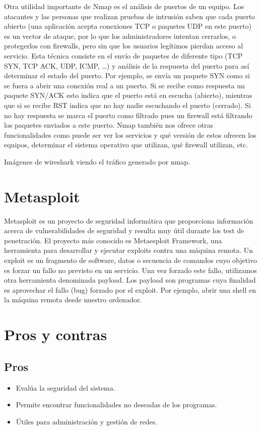 \documentclass[a4paper, 11pt]{article}
\theoremstyle{plain}
\begin{document}
Otra utilidad importante de Nmap es el análisis de puertos de un equipo. Los atacantes 
y las personas que realizan pruebas de intrusión saben que cada puerto abierto 
(una aplicación acepta conexiones TCP o paquetes UDP en este puerto) es 
un vector de ataque, por lo que los administradores intentan cerrarlos, o protegerlos
con firewalls, pero sin que los usuarios legítimos pierdan acceso al servicio.
Esta técnica consiste en el envío de paquetes de diferente tipo (TCP SYN, TCP ACK, UDP, ICMP, \dots)
y análisis de la respuesta del puerto para así determinar el estado del puerto.
Por ejemplo, se envía un paquete SYN como si se fuera a abrir una conexión real a un puerto.
Si se recibe como respuesta un paquete SYN/ACK esto indica que el puerto está en escucha (abierto),
mientras que si se recibe RST indica que no hay nadie escuchando el puerto (cerrado). Si 
no hay respuesta se marca el puerto como filtrado pues un firewall está filtrando los paquetes
enviados a este puerto.
Nmap también nos ofrece otras funcionalidades como puede ser ver los servicios y qué versión
de estos ofrecen los equipos, determinar el sistema operativo que utilizan, qué 
firewall utilizan, etc.

Imágenes de wireshark viendo el tráfico generado por nmap.

\section{Metasploit}

Metasploit es un proyecto de seguridad informática que proporciona información acerca de vulnerabilidades de seguridad y resulta muy útil durante los test de penetración. El proyecto más conocido es Metaesploit Framework, una herramienta para desarrollar y ejecutar exploits contra una máquina remota. Un exploit es un fragmento de software, datos o secuencia de comandos cuyo objetivo es forzar un fallo no previsto en un servicio. Una vez forzado este fallo, utilizamos otra herramienta denominada payload. Los payload son programas cuya finalidad es aprovechar el fallo (bug) forzado por el exploit. Por ejemplo, abrir una shell en la máquina remota desde nuestro ordenador. 

\section{Pros y contras}
\subsection{Pros}
\begin{itemize}
	\item Evalúa la seguridad del sistema.
	\item Permite encontrar funcionalidades no deseadas de los programas.
	\item Útiles para administración y gestión de redes.
\end{itemize}
\end{document}
